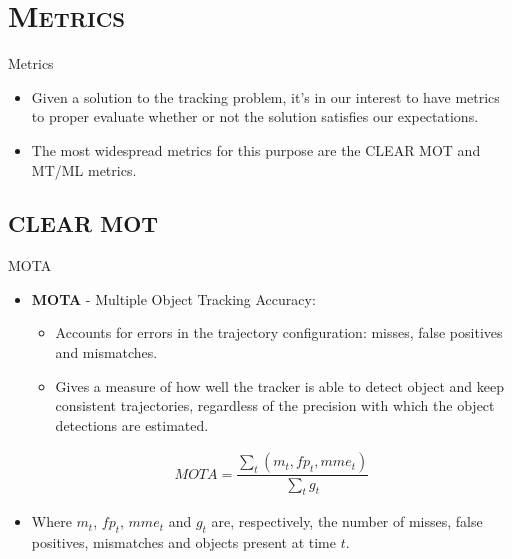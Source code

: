 \section{\scshape Metrics}
\begin{frame}{Metrics}
\begin{itemize}
	\item Given a solution to the tracking problem, it's in our interest to have metrics to proper evaluate whether or not the solution satisfies our expectations.
	\item The most widespread metrics for this purpose are the CLEAR MOT and MT/ML metrics.
\end{itemize}
\end{frame}


\subsection{CLEAR MOT}
\begin{frame}{MOTA}
\begin{itemize}
	\item \textbf{MOTA} - Multiple Object Tracking Accuracy:
	\begin{itemize}
		\item Accounts for errors in the trajectory configuration: misses, false positives and mismatches.
		\item Gives a measure of how well the tracker is able to detect object and keep consistent trajectories, regardless of the precision with which the object detections are estimated.
	\end{itemize}
	\begin{gather*}
	MOTA = \dfrac{\sum_{t} (m_t, fp_t, mme_t)}{\sum_t g_t}
	\end{gather*}
	\item Where $m_t$, $fp_t$, $mme_t$ and $g_t$ are, respectively, the number of misses, false positives,  mismatches and objects present at time $t$.
\end{itemize}
\end{frame}

